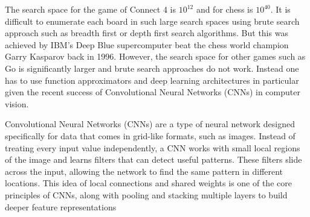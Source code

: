 
The search space for the game of Connect 4 is $10^{12}$ and for chess is $10^{40}$. It is difficult to enumerate each board in such large search spaces using brute search approach such as breadth first or depth first search algorithms. But this was achieved  by IBM’s Deep Blue supercomputer beat the chess world champion Garry Kasparov back in 1996. However, the search space for other games such as Go is significantly larger and brute search approaches do not work. Instead one has to use function approximators and deep learning architectures in particular given the recent success of Convolutional Neural Networks (CNNs) in computer vision. 



Convolutional Neural Networks (CNNs) are a type of neural network designed specifically for data that comes in grid-like formats, such as images. Instead of treating every input value independently, a CNN works with small local regions of the image and learns filters that can detect useful patterns. These filters slide across the input, allowing the network to find the same pattern in different locations. This idea of local connections and shared weights is one of the core principles of CNNs, along with pooling and stacking multiple layers to build deeper feature representations \cite{lecun:hal-04206682}

